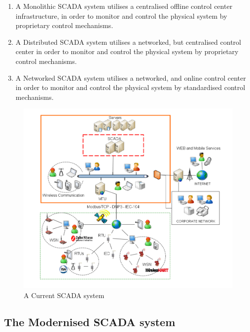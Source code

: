  \begin{enumerate}
     \item A Monolithic SCADA system utilises a centralised offline control center  infrastructure, in order to monitor and control the physical system by proprietary control mechanisms.
     \item A Distributed SCADA system utilises a networked, but centralised control  center in order to monitor and control the physical system by proprietary control mechanisms. 
     \item A Networked SCADA system utilises a networked, and online control  center in order to monitor and control the physical system by standardised control mechanisms.
 \end{enumerate}



 \begin{figure}[ht]
\centering
    \includegraphics[trim=20 20 20 10, clip, width=\textwidth]{figures/SCADA-Current.png}
\caption[A Current SCADA system]{A Current SCADA system \cite[p. 124]{alcaraz2012security}}

\end{figure}





\subsection{The Modernised SCADA system}
 
